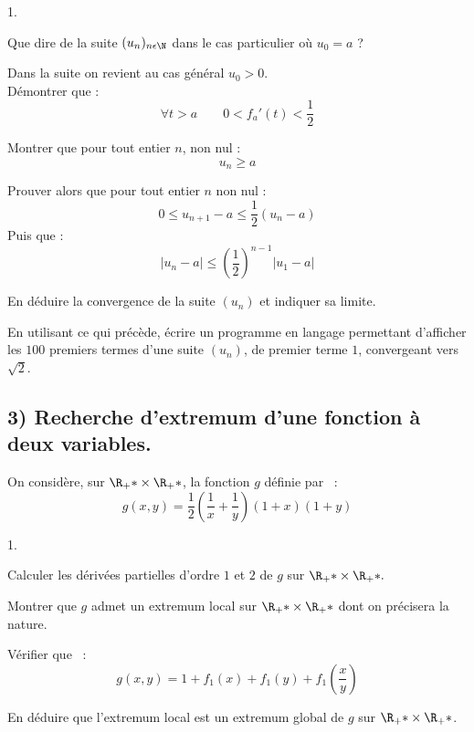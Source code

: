 \documentclass[11pt]{article}%
\begin{document}
\begin{noliste}{1.}
 \setlength{\itemsep}{4mm}
\item Que dire de la suite $(u_{n})_{n\epsilon \N}$ dans le cas
particulier où $u_{0} = a$ ?

\item Dans la suite on revient au cas général $u_{0}>0$.\\
Démontrer que : 
\[
\forall t>a\qquad 0<f_{a}{\prime }(t)<\frac 12
\]

\item Montrer que pour tout entier $n$, non nul : 
\[
\left. u_{n}\geq a\right.
\]

\item Prouver alors que pour tout entier $n$ non nul : 
\[
0\leq u_{n + 1}-a\leq \dfrac{1}{2}\left( u_{n}-a\right)
\]
Puis que : 
\[
\left| u_{n}-a\right| \leq \left( \dfrac{1}{2}\right)
^{n-1}\left| u_{1}-a\right|
\]

\item En déduire la convergence de la suite $(u_{n})$ et indiquer sa
limite.

\item En utilisant ce qui précède, écrire un programme en
langage \Scilab{} permettant d'afficher les $100$ premiers termes d'une
suite $(u_{n})$, de premier terme $1$, convergeant vers $\sqrt{2}$.
\end{noliste}

\subsection*{3) Recherche d'extremum d'une fonction à deux variables.}

On considère, sur $\R_{+}{*}\times \R_{+}{*}$, la
fonction $g$ définie par~ : 
\[
g(x,y) = \frac 12(\frac 1x + \frac 1y)(1 + x)(1 + y)
\]

\begin{noliste}{1.}
 \setlength{\itemsep}{4mm}
\item Calculer les dérivées partielles d'ordre $1$ et $2$ de $g$ sur 
$\R_{+}{*}\times \R_{+}{*}.$

\item Montrer que $g$ admet un extremum local sur $\R_{+}{*}\times 
\R_{+}{*}$ dont on précisera la nature.

\item Vérifier que~ : 
\[
g(x,y) = 1 + f_{1}(x) + f_{1}(y) + f_{1}(\frac xy)
\]

\item En déduire que l'extremum local est un extremum global de $g$ sur
$\R_{+}{\ast }\times \R_{+}{\ast }$.
\end{noliste}
\end{document}
